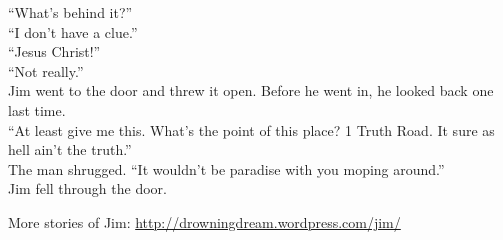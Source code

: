 \enquote{What's behind it?}\\



\enquote{I don't have a clue.}\\



\enquote{Jesus Christ!}\\



\enquote{Not really.}\\



Jim went to the door and threw it open.  Before he went in, he looked back one last time.\\



\enquote{At least give me this.  What's the point of this place?  1 Truth Road.  It sure as hell ain't the truth.}\\



The man shrugged.  \enquote{It wouldn't be paradise with you moping around.}\\



Jim fell through the door.

More stories of Jim: \url{http://drowningdream.wordpress.com/jim/}